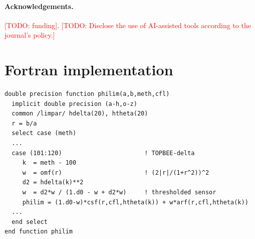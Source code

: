 \documentclass[11pt]{article}
\newcommand{\todo}[1]{\textcolor{red}{[TODO: #1]}}
\theoremstyle{plain}
\theoremstyle{definition}
\begin{document}
\paragraph{Acknowledgements.} \todo{funding}. \todo{Disclose the use of AI-assisted tools according to the journal's policy.}

\appendix
\section{Fortran implementation}\label{app:code}
\begin{lstlisting}[caption={Core of the modified \texttt{philim.f90} (TOPBEE branch). \texttt{csf}, \texttt{arf} evaluate~\eqref{eq:CS} and~\eqref{eq:AR}; \texttt{omf} evaluates $\omega$.},label={lst:philim}]
double precision function philim(a,b,meth,cfl)
  implicit double precision (a-h,o-z)
  common /limpar/ hdelta(20), htheta(20)
  r = b/a
  select case (meth)
  ...
  case (101:120)                       ! TOPBEE-delta
     k  = meth - 100
     w  = omf(r)                       ! (2|r|/(1+r^2))^2
     d2 = hdelta(k)**2
     w  = d2*w / (1.d0 - w + d2*w)     ! thresholded sensor
     philim = (1.d0-w)*csf(r,cfl,htheta(k)) + w*arf(r,cfl,htheta(k))
  ...
  end select
end function philim
\end{lstlisting}

\clearpage
\end{document}
